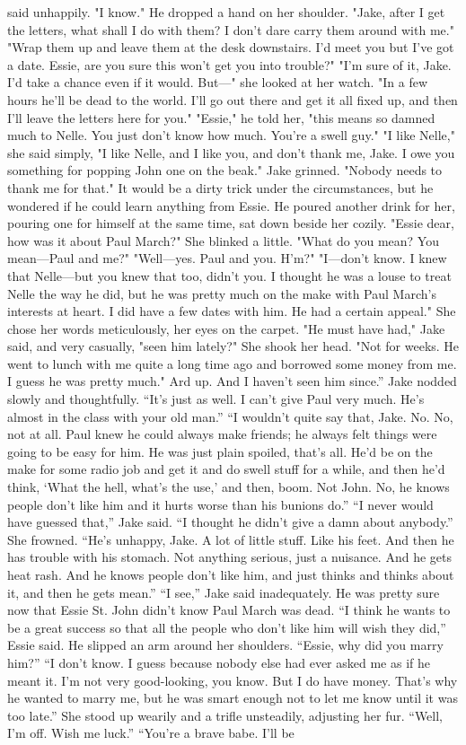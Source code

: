 \documentclass{novel}
\begin{document}
said unhappily. "I know." He dropped a hand on her shoulder. "Jake, after I get the letters, what shall I do with them? I don't dare carry them around with me." "Wrap them up and leave them at the desk downstairs. I'd meet you but I've got a date. Essie, are you sure this won't get you into trouble?" "I'm sure of it, Jake. I'd take a chance even if it would. But—" she looked at her watch. "In a few hours he'll be dead to the world. I'll go out there and get it all fixed up, and then I'll leave the letters here for you." "Essie," he told her, "this means so damned much to Nelle. You just don't know how much. You're a swell guy." "I like Nelle," she said simply, "I like Nelle, and I like you, and don't thank me, Jake. I owe you something for popping John one on the beak." Jake grinned. "Nobody needs to thank me for that." It would be a dirty trick under the circumstances, but he wondered if he could learn anything from Essie. He poured another drink for her, pouring one for himself at the same time, sat down beside her cozily. "Essie dear, how was it about Paul March?" She blinked a little. "What do you mean? You mean—Paul and me?" "Well—yes. Paul and you. H'm?" "I—don't know. I knew that Nelle—but you knew that too, didn't you. I thought he was a louse to treat Nelle the way he did, but he was pretty much on the make with Paul March's interests at heart. I did have a few dates with him. He had a certain appeal." She chose her words meticulously, her eyes on the carpet. "He must have had," Jake said, and very casually, "seen him lately?" She shook her head. "Not for weeks. He went to lunch with me quite a long time ago and borrowed some money from me. I guess he was pretty much." Ard up. And I haven’t seen him since.” Jake nodded slowly and thoughtfully. “It’s just as well. I can’t give Paul very much. He’s almost in the class with your old man.” “I wouldn’t quite say that, Jake. No. No, not at all. Paul knew he could always make friends; he always felt things were going to be easy for him. He was just plain spoiled, that’s all. He’d be on the make for some radio job and get it and do swell stuff for a while, and then he’d think, ‘What the hell, what’s the use,’ and then, boom. Not John. No, he knows people don’t like him and it hurts worse than his bunions do.” “I never would have guessed that,” Jake said. “I thought he didn’t give a damn about anybody.” She frowned. “He’s unhappy, Jake. A lot of little stuff. Like his feet. And then he has trouble with his stomach. Not anything serious, just a nuisance. And he gets heat rash. And he knows people don’t like him, and just thinks and thinks about it, and then he gets mean.” “I see,” Jake said inadequately. He was pretty sure now that Essie St. John didn’t know Paul March was dead. “I think he wants to be a great success so that all the people who don’t like him will wish they did,” Essie said. He slipped an arm around her shoulders. “Essie, why did you marry him?” “I don’t know. I guess because nobody else had ever asked me as if he meant it. I’m not very good-looking, you know. But I do have money. That’s why he wanted to marry me, but he was smart enough not to let me know until it was too late.” She stood up wearily and a trifle unsteadily, adjusting her fur. “Well, I’m off. Wish me luck.” “You’re a brave babe. I'll be 
\end{document}
